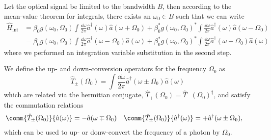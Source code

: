Let the optical signal be limited to the bandwidth $B$, then
according to the mean-value theorem for integrals, there exists an $\omega_0\in B$ such that we can write
\begin{equation}
	\begin{split}
		\hat{H}_\text{int}
		&=
		\beta_0
		g(\omega_0,\Omega_0)
		\int\frac{\dd{\omega}}{2\pi}
		\hat{a}^\dagger(\omega)
		\hat{a}(\omega+\Omega_0)
		+
		\beta_0^*
		g(\omega_0,\Omega_0)^*
		\int\frac{\dd{\omega}}{2\pi}
		\hat{a}^\dagger(\omega)
		\hat{a}(\omega-\Omega_0)
		\\
		&=
		\beta_0
		g(\omega_0,\Omega_0)
		\int\frac{\dd{\omega}}{2\pi}
		\hat{a}^\dagger(\omega-\Omega_0)
		\hat{a}(\omega)
		+
		\beta_0^*
		g(\omega_0,\Omega_0)^*
		\int\frac{\dd{\omega}}{2\pi}
		\hat{a}^\dagger(\omega+\Omega_0)
		\hat{a}(\omega)
	\end{split}
	\label{eq:frequency_conversion_interaction_meanvalue}
\end{equation}
where we performed an integration variable substitution in the second step.

We define the up- and down-conversion operators for the frequency $\Omega_0$ as
\begin{equation}
	\hat{T}_\pm(\Omega_0)
	=
	\int\frac{\dd{\omega}}{2\pi}
	\hat{a}^\dagger(\omega\pm\Omega_0)
	\hat{a}(\omega)
	\label{eq:frequency_conversion_operator}
\end{equation}
which are related via the hermitian conjugate, $\hat{T}_+(\Omega_0)=\hat{T}_-(\Omega_0)^\dagger$, and satisfy the commutation relations
\begin{align}
	\comm{\hat{T}_\pm(\Omega_0)}{\hat{a}(\omega)}
	&=
	-
	\hat{a}(\omega\mp\Omega_0)
	&
	\comm{\hat{T}_\pm(\Omega_0)}{\hat{a}^\dagger(\omega)}
	&=
	+
	\hat{a}^\dagger(\omega\pm\Omega_0)
	,
\end{align}
which can be used to up- or donw-convert the frequency of a photon by $\Omega_0$.

